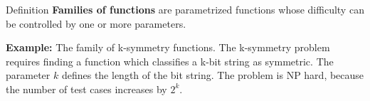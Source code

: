 \begin{frame}
\vspace*{2mm}
\begin{block}{
Definition
}
{\bf Families of functions} are parametrized functions whose difficulty
can be controlled by one or more parameters.
 
{\bf Example:} The family of k-symmetry functions.
The k-symmetry problem requires finding a function which classifies
a k-bit string as symmetric.
The parameter $k$ defines the length of the bit string.
The problem is NP hard, because the number of test cases increases by $2^k$.
\end{block}
\end{frame}